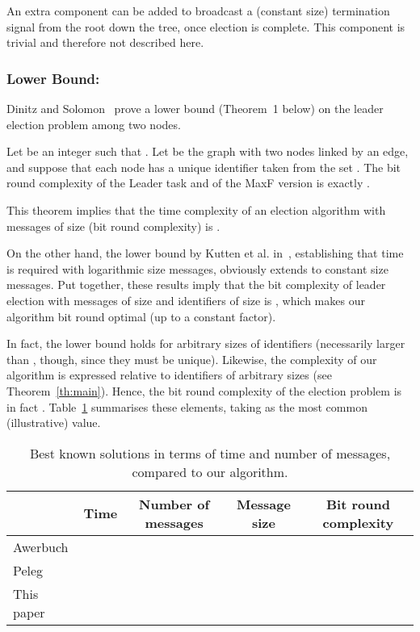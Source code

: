\documentclass[11pt,envcountsame,letterpaper]{llncs}
\begin{document}
An extra component can be added to broadcast a (constant size) termination signal from the root down the tree, once election is complete. This component is trivial and therefore not described here.

\subsubsection{Lower Bound:}

Dinitz and Solomon~\cite{DS07} prove a lower bound (Theorem~1 below) on the leader election problem among two nodes.
\begin{theorem}[\cite{DS07}]
Let  be an integer such that .
Let  be the graph with two nodes linked by an edge, and suppose that each node
has a unique identifier taken from the set . The bit
round complexity
of the Leader task and of the MaxF version is exactly 
.
\end{theorem}
This theorem implies that  the time complexity of an election algorithm with
messages of size  (bit round complexity) is .


On the other hand, the lower bound by Kutten et al. in~\cite{KPPRT15}, establishing that  time is required with logarithmic size messages, obviously extends to constant size messages. Put together, these results imply that the bit  complexity of leader election
with messages of size  and identifiers of size  is , which makes our algorithm bit round optimal (up to a constant factor).

In fact, the lower bound holds for arbitrary sizes  of identifiers (necessarily larger than , though, since they must be unique). Likewise, the complexity of our algorithm is expressed relative to identifiers of arbitrary sizes (see Theorem~\ref{th:main}). Hence, the bit round complexity of the election problem is in fact .
Table~\ref{tab:result} summarises these elements, taking  as the most common (illustrative) value.

\begin{table}
\label{tab:result}
\centering
\begin{tabular}{|@{\,}l@{\,}|@{\,}c@{\,}|@{\,}c@{\,}|@{\,}c@{\,}|@{\,}c@{\,}|}
\hline
& Time & Number of messages & Message size & Bit round complexity \\
\hline
Awerbuch  \cite{Awer87}&   &   &  & 
\\
\hline
Peleg  \cite{Peleg90}&    &  &  &  \\
\hline
This paper &    &  &  & 
 \\\hline
\end{tabular}
\medskip
\caption{Best known solutions in terms of time and number of messages, compared to our algorithm.}
\end{table}
\end{document}
